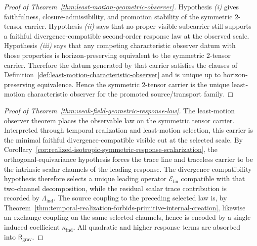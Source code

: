 
\begin{proof}[Proof of Theorem~\ref{thm:least-motion-geometric-observer}]
\label{proof:thm:least-motion-geometric-observer}
Hypothesis \emph{(i)} gives faithfulness, closure-admissibility, and promotion
stability of the symmetric \(2\)-tensor carrier. Hypothesis \emph{(ii)} says
that no proper visible subcarrier still supports a faithful
divergence-compatible second-order response law at the observed scale.
Hypothesis \emph{(iii)} says that any competing characteristic observer datum
with those properties is horizon-preserving equivalent to the symmetric
\(2\)-tensor carrier. Therefore the datum generated by that carrier satisfies
the clauses of Definition~\ref{def:least-motion-characteristic-observer} and
is unique up to horizon-preserving equivalence. Hence the symmetric
\(2\)-tensor carrier is the unique least-motion characteristic observer for
the promoted source/transport family.
\end{proof}

\begin{proof}[Proof of Theorem~\ref{thm:weak-field-geometric-response-law}]
\label{proof:thm:weak-field-geometric-response-law}
The least-motion observer theorem places the observable law on the symmetric
tensor carrier. Interpreted through temporal realization and least-motion
selection, this carrier is the minimal faithful divergence-compatible visible
cut at the selected scale. By
Corollary~\ref{cor:realized-isotropic-symmetric-response-scalarization}, the
orthogonal-equivariance hypothesis forces the trace line and traceless carrier
to be the intrinsic scalar channels of the leading response. The
divergence-compatibility hypothesis therefore selects a unique leading operator
\(\mathcal E_{\mathrm{lin}}\) compatible with that two-channel decomposition,
while the residual scalar trace contribution is recorded by
\(\Lambda_{\mathrm{ind}}\). The source coupling to the preceding selected law
is, by
Theorem~\ref{thm:temporal-realization-forbids-primitive-internal-creation},
likewise an exchange coupling on the same selected channels,
hence is encoded by a single induced coefficient \(\kappa_{\mathrm{ind}}\).
All quadratic and higher response terms are absorbed into
\(\mathsf R_{\mathrm{grav}}\).
\end{proof}

